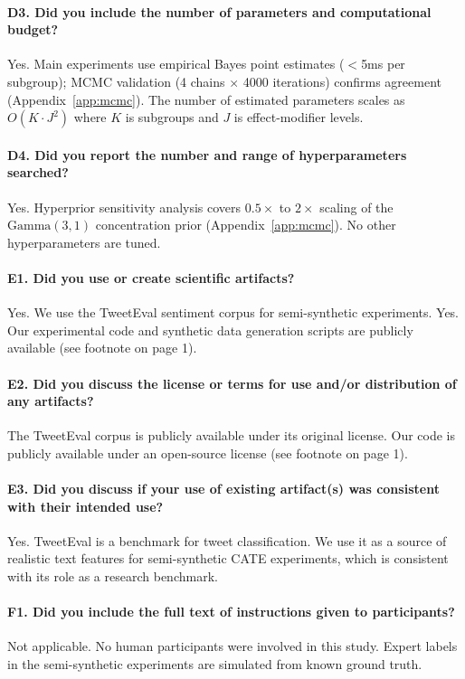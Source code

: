 \paragraph{D3. Did you include the number of parameters and computational budget?}
Yes. Main experiments use empirical Bayes point estimates ($<$5ms per subgroup); MCMC validation (4 chains $\times$ 4000 iterations) confirms agreement (Appendix~\ref{app:mcmc}). The number of estimated parameters scales as $O(K \cdot J^2)$ where $K$ is subgroups and $J$ is effect-modifier levels.

\paragraph{D4. Did you report the number and range of hyperparameters searched?}
Yes. Hyperprior sensitivity analysis covers $0.5\times$ to $2\times$ scaling of the $\text{Gamma}(3,1)$ concentration prior (Appendix~\ref{app:mcmc}). No other hyperparameters are tuned.

\paragraph{E1. Did you use or create scientific artifacts?}
Yes. We use the TweetEval sentiment corpus for semi-synthetic experiments. Yes. Our experimental code and synthetic data generation scripts are publicly available (see footnote on page 1).

\paragraph{E2. Did you discuss the license or terms for use and/or distribution of any artifacts?}
The TweetEval corpus is publicly available under its original license. Our code is publicly available under an open-source license (see footnote on page 1).

\paragraph{E3. Did you discuss if your use of existing artifact(s) was consistent with their intended use?}
Yes. TweetEval is a benchmark for tweet classification. We use it as a source of realistic text features for semi-synthetic CATE experiments, which is consistent with its role as a research benchmark.

\paragraph{F1. Did you include the full text of instructions given to participants?}
Not applicable. No human participants were involved in this study. Expert labels in the semi-synthetic experiments are simulated from known ground truth.

